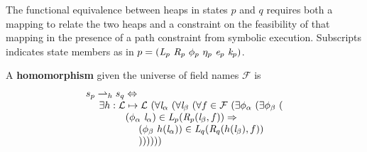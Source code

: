 The functional equivalence between heaps in states $p$
and $q$ requires both a mapping to relate the two heaps and a
constraint on the feasibility of that mapping in the presence of a
path constraint from symbolic execution. Subscripts indicates state
members as in $p = (
\emph{L}_p\ \emph{R}_p\ \phi_p\ \eta_p\ \emph{e}_p\ \emph{k}_p )$.
\begin{definition}
\label{def:homomorphism}
A \textbf{homomorphism} given the universe of field names $\mathcal{F}$ is 
$$
\begin{array}{l}
 s_p \rightharpoonup_{h} s_q \Leftrightarrow \\
\ \ \ \ \exists h: \mathcal{L} \mapsto \mathcal{L}\ (\forall \cfgnt{l}_\alpha\ (\forall \cfgnt{l}_\beta\ (\forall f \in \mathcal{F}\ ( \exists \phi_\alpha\ (\exists \phi_\beta\ ( \\ 
\ \ \ \ \ \ \ \ \ \ \ \ (\phi_\alpha\ \cfgnt{l}_\alpha) \in \cfgnt{L}_p(\cfgnt{R}_p (\cfgnt{l}_\beta,f )) \Rightarrow \\
\ \ \ \ \ \ \ \ \ \ \ \ \ \ \ \ (\phi_\beta\ h(\cfgnt{l}_\alpha))\in \cfgnt{L}_q(\cfgnt{R}_q (h(\cfgnt{l}_\beta),f ))\ \\
\ \ \ \ \ \ \ \ \ \ \ \ \ \ \ \  )) ) ) ) )
\end{array}
$$
\end{definition}

